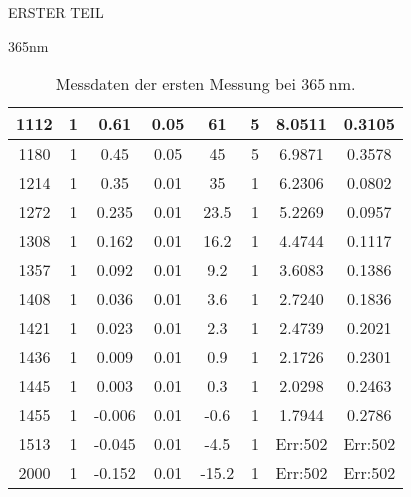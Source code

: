\begin{appendix}
\begin{chapter}{ERSTER TEIL}
\begin{section}{365nm}
\begin{table}[htbp]
\begin{tabular}{|c|c|c|c|c|c|c|c|}
            1112 & 1 & 0.61 & 0.05 & 61 & 5 & 8.0511 & 0.3105 \\ \hline
            1180 & 1 & 0.45 & 0.05 & 45 & 5 & 6.9871 & 0.3578 \\ \hline
            1214 & 1 & 0.35 & 0.01 & 35 & 1 & 6.2306 & 0.0802 \\ \hline
            1272 & 1 & 0.235 & 0.01 & 23.5 & 1 & 5.2269 & 0.0957 \\ \hline
            1308 & 1 & 0.162 & 0.01 & 16.2 & 1 & 4.4744 & 0.1117 \\ \hline
            1357 & 1 & 0.092 & 0.01 & 9.2 & 1 & 3.6083 & 0.1386 \\ \hline
            1408 & 1 & 0.036 & 0.01 & 3.6 & 1 & 2.7240 & 0.1836 \\ \hline
            1421 & 1 & 0.023 & 0.01 & 2.3 & 1 & 2.4739 & 0.2021 \\ \hline
            1436 & 1 & 0.009 & 0.01 & 0.9 & 1 & 2.1726 & 0.2301 \\ \hline
            1445 & 1 & 0.003 & 0.01 & 0.3 & 1 & 2.0298 & 0.2463 \\ \hline
            1455 & 1 & -0.006 & 0.01 & -0.6 & 1 & 1.7944 & 0.2786 \\ \hline
            1513 & 1 & -0.045 & 0.01 & -4.5 & 1 & Err:502 & Err:502 \\ \hline
            2000 & 1 & -0.152 & 0.01 & -15.2 & 1 & Err:502 & Err:502 \\ \hline
          \end{tabular}
          \caption{Messdaten der ersten Messung bei $\SI{365}{\nano\meter}$.}
          \label{tab:365_1}
        \end{table}
        

\end{section}
\end{chapter}
\end{appendix}
